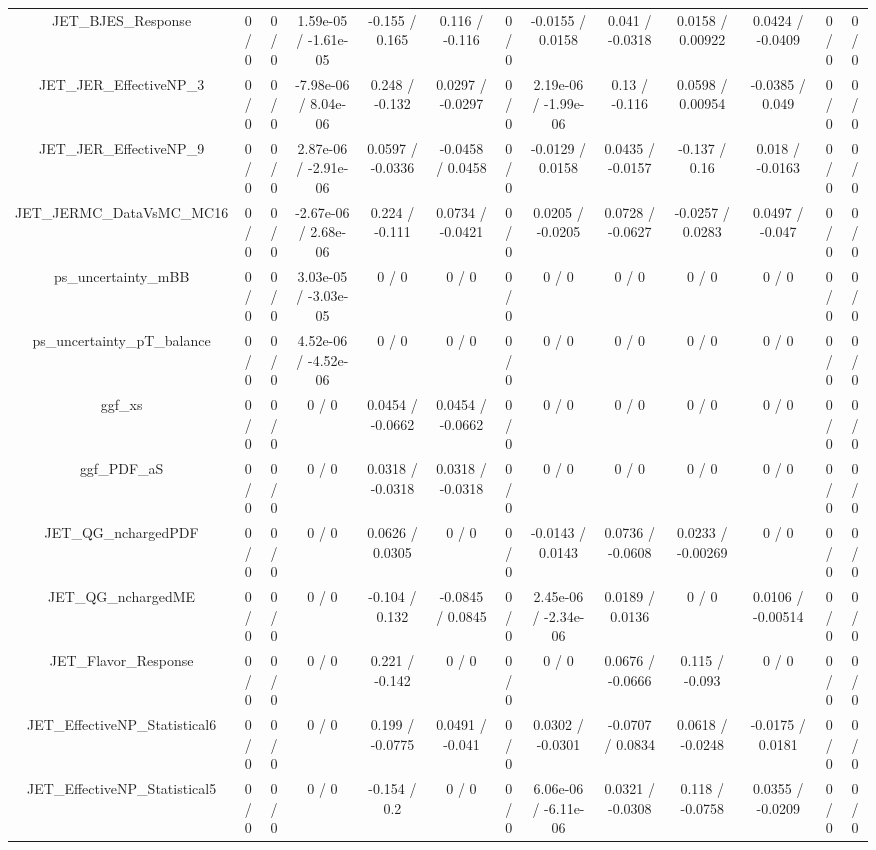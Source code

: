 \documentclass[10pt]{article}
\begin{document}
\begin{table}[htbp]
\begin{center}
\begin{tabular}{|c|c|c|c|c|c|c|c|c|c|c|c|c|}
  JET_BJES_Response & 0 / 0 & 0 / 0 & 1.59e-05 / -1.61e-05 & -0.155 / 0.165 & 0.116 / -0.116 & 0 / 0 & -0.0155 / 0.0158 & 0.041 / -0.0318 & 0.0158 / 0.00922 & 0.0424 / -0.0409 & 0 / 0 & 0 / 0 \\ 
  JET_JER_EffectiveNP_3 & 0 / 0 & 0 / 0 & -7.98e-06 / 8.04e-06 & 0.248 / -0.132 & 0.0297 / -0.0297 & 0 / 0 & 2.19e-06 / -1.99e-06 & 0.13 / -0.116 & 0.0598 / 0.00954 & -0.0385 / 0.049 & 0 / 0 & 0 / 0 \\ 
  JET_JER_EffectiveNP_9 & 0 / 0 & 0 / 0 & 2.87e-06 / -2.91e-06 & 0.0597 / -0.0336 & -0.0458 / 0.0458 & 0 / 0 & -0.0129 / 0.0158 & 0.0435 / -0.0157 & -0.137 / 0.16 & 0.018 / -0.0163 & 0 / 0 & 0 / 0 \\ 
  JET_JERMC_DataVsMC_MC16 & 0 / 0 & 0 / 0 & -2.67e-06 / 2.68e-06 & 0.224 / -0.111 & 0.0734 / -0.0421 & 0 / 0 & 0.0205 / -0.0205 & 0.0728 / -0.0627 & -0.0257 / 0.0283 & 0.0497 / -0.047 & 0 / 0 & 0 / 0 \\ 
  ps_uncertainty_mBB & 0 / 0 & 0 / 0 & 3.03e-05 / -3.03e-05 & 0 / 0 & 0 / 0 & 0 / 0 & 0 / 0 & 0 / 0 & 0 / 0 & 0 / 0 & 0 / 0 & 0 / 0 \\ 
  ps_uncertainty_pT_balance & 0 / 0 & 0 / 0 & 4.52e-06 / -4.52e-06 & 0 / 0 & 0 / 0 & 0 / 0 & 0 / 0 & 0 / 0 & 0 / 0 & 0 / 0 & 0 / 0 & 0 / 0 \\ 
  ggf_xs & 0 / 0 & 0 / 0 & 0 / 0 & 0.0454 / -0.0662 & 0.0454 / -0.0662 & 0 / 0 & 0 / 0 & 0 / 0 & 0 / 0 & 0 / 0 & 0 / 0 & 0 / 0 \\ 
  ggf_PDF_aS & 0 / 0 & 0 / 0 & 0 / 0 & 0.0318 / -0.0318 & 0.0318 / -0.0318 & 0 / 0 & 0 / 0 & 0 / 0 & 0 / 0 & 0 / 0 & 0 / 0 & 0 / 0 \\ 
  JET_QG_nchargedPDF & 0 / 0 & 0 / 0 & 0 / 0 & 0.0626 / 0.0305 & 0 / 0 & 0 / 0 & -0.0143 / 0.0143 & 0.0736 / -0.0608 & 0.0233 / -0.00269 & 0 / 0 & 0 / 0 & 0 / 0 \\ 
  JET_QG_nchargedME & 0 / 0 & 0 / 0 & 0 / 0 & -0.104 / 0.132 & -0.0845 / 0.0845 & 0 / 0 & 2.45e-06 / -2.34e-06 & 0.0189 / 0.0136 & 0 / 0 & 0.0106 / -0.00514 & 0 / 0 & 0 / 0 \\ 
  JET_Flavor_Response & 0 / 0 & 0 / 0 & 0 / 0 & 0.221 / -0.142 & 0 / 0 & 0 / 0 & 0 / 0 & 0.0676 / -0.0666 & 0.115 / -0.093 & 0 / 0 & 0 / 0 & 0 / 0 \\ 
  JET_EffectiveNP_Statistical6 & 0 / 0 & 0 / 0 & 0 / 0 & 0.199 / -0.0775 & 0.0491 / -0.041 & 0 / 0 & 0.0302 / -0.0301 & -0.0707 / 0.0834 & 0.0618 / -0.0248 & -0.0175 / 0.0181 & 0 / 0 & 0 / 0 \\ 
  JET_EffectiveNP_Statistical5 & 0 / 0 & 0 / 0 & 0 / 0 & -0.154 / 0.2 & 0 / 0 & 0 / 0 & 6.06e-06 / -6.11e-06 & 0.0321 / -0.0308 & 0.118 / -0.0758 & 0.0355 / -0.0209 & 0 / 0 & 0 / 0 \\ 

\end{tabular}
\end{center}
\end{table}
\end{document}
